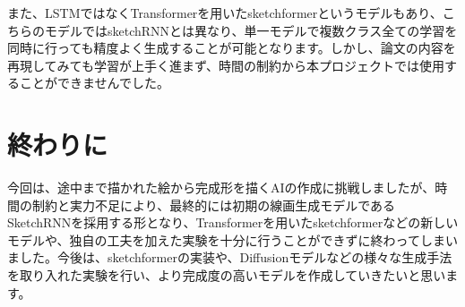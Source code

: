 また、LSTMではなくTransformerを用いたsketchformer\cite{sketchformer}というモデルもあり、こちらのモデルではsketchRNN\cite{sketchRNN}とは異なり、単一モデルで複数クラス全ての学習を同時に行っても精度よく生成することが可能となります。しかし、論文の内容を再現してみても学習が上手く進まず、時間の制約から本プロジェクトでは使用することができませんでした。

\section{終わりに}

今回は、途中まで描かれた絵から完成形を描くAIの作成に挑戦しましたが、時間の制約と実力不足により、最終的には初期の線画生成モデルであるSketchRNN\cite{sketchRNN}を採用する形となり、Transformerを用いたsketchformer\cite{sketchformer}などの新しいモデルや、独自の工夫を加えた実験を十分に行うことができずに終わってしまいました。今後は、sketchformer\cite{sketchformer}の実装や、Diffusionモデルなどの様々な生成手法を取り入れた実験を行い、より完成度の高いモデルを作成していきたいと思います。
